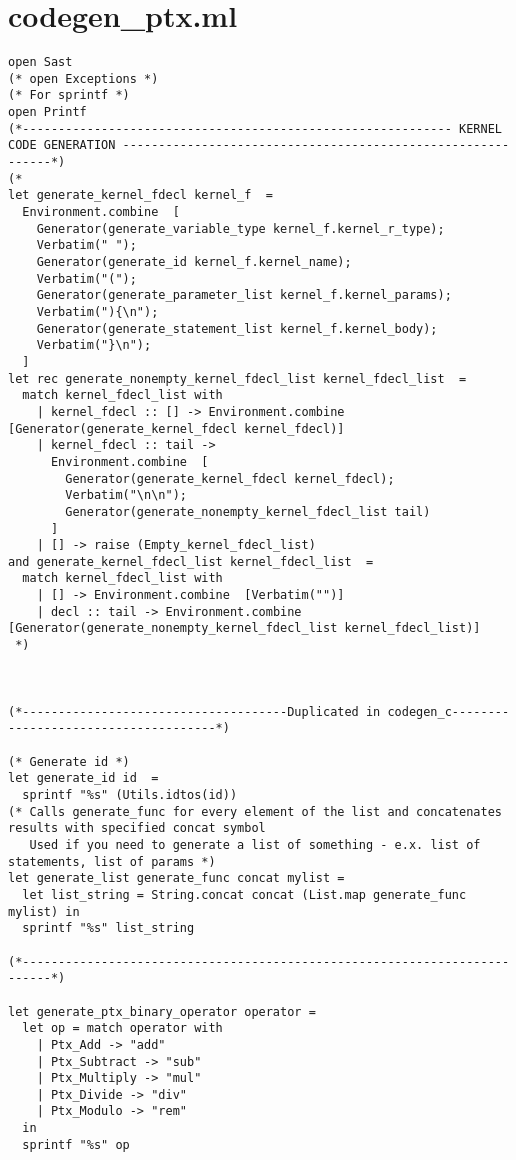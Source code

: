 \section{codegen_ptx.ml}
\begin{verbatim}
open Sast
(* open Exceptions *)
(* For sprintf *)
open Printf
(*------------------------------------------------------------ KERNEL CODE GENERATION ------------------------------------------------------------*)
(* 
let generate_kernel_fdecl kernel_f  =
  Environment.combine  [
    Generator(generate_variable_type kernel_f.kernel_r_type);
    Verbatim(" ");
    Generator(generate_id kernel_f.kernel_name);
    Verbatim("(");
    Generator(generate_parameter_list kernel_f.kernel_params);
    Verbatim("){\n");
    Generator(generate_statement_list kernel_f.kernel_body);
    Verbatim("}\n");
  ]
let rec generate_nonempty_kernel_fdecl_list kernel_fdecl_list  =
  match kernel_fdecl_list with
    | kernel_fdecl :: [] -> Environment.combine  [Generator(generate_kernel_fdecl kernel_fdecl)]
    | kernel_fdecl :: tail ->
      Environment.combine  [
        Generator(generate_kernel_fdecl kernel_fdecl);
        Verbatim("\n\n");
        Generator(generate_nonempty_kernel_fdecl_list tail)
      ]
    | [] -> raise (Empty_kernel_fdecl_list)
and generate_kernel_fdecl_list kernel_fdecl_list  =
  match kernel_fdecl_list with
    | [] -> Environment.combine  [Verbatim("")]
    | decl :: tail -> Environment.combine  [Generator(generate_nonempty_kernel_fdecl_list kernel_fdecl_list)]
 *)



(*-------------------------------------Duplicated in codegen_c-------------------------------------*)

(* Generate id *)
let generate_id id  = 
  sprintf "%s" (Utils.idtos(id))
(* Calls generate_func for every element of the list and concatenates results with specified concat symbol
   Used if you need to generate a list of something - e.x. list of statements, list of params *)
let generate_list generate_func concat mylist = 
  let list_string = String.concat concat (List.map generate_func mylist) in
  sprintf "%s" list_string

(*--------------------------------------------------------------------------*)

let generate_ptx_binary_operator operator = 
  let op = match operator with
    | Ptx_Add -> "add"
    | Ptx_Subtract -> "sub"
    | Ptx_Multiply -> "mul"
    | Ptx_Divide -> "div"
    | Ptx_Modulo -> "rem"
  in
  sprintf "%s" op


\end{verbatim}
